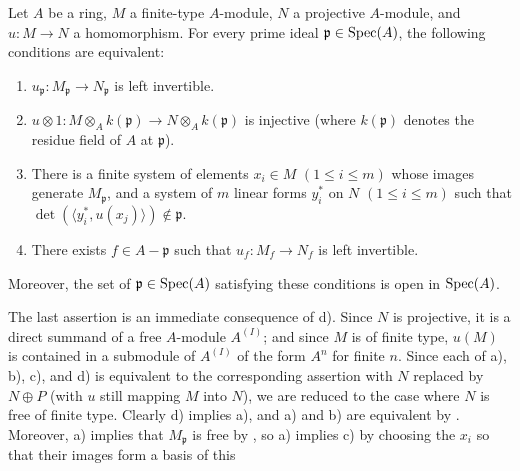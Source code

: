 \begin{corollary}[19.1.12]
\label{0.19.1.12}
Let $A$ be a ring, $M$ a finite-type $A$-module, $N$ a projective $A$-module, and $u:M\to N$ a homomorphism.
For every prime ideal $\mathfrak p\in\operatorname{Spec}(A)$, the following conditions are equivalent:
\begin{enumerate}
  \item[a)] $u_{\mathfrak p}:M_{\mathfrak p}\to N_{\mathfrak p}$ is left invertible.
  \item[b)] $u\otimes1:M\otimes_Ak(\mathfrak p)\to N\otimes_Ak(\mathfrak p)$ is injective (where $k(\mathfrak p)$ denotes the residue field of $A$ at $\mathfrak p$).
  \item[c)] There is a finite system of elements $x_i\in M$ $(1\leq i\leq m)$ whose images generate $M_{\mathfrak p}$, and a system of $m$ linear forms $y_i^*$ on $N$ $(1\leq i\leq m)$ such that $\det(\langle y_i^*,u(x_j)\rangle)\notin\mathfrak p$.
  \item[d)] There exists $f\in A-\mathfrak p$ such that $u_f:M_f\to N_f$ is left invertible.
\end{enumerate}
Moreover, the set of $\mathfrak p\in\operatorname{Spec}(A)$ satisfying these conditions is open in $\operatorname{Spec}(A)$.
\end{corollary}

The last assertion is an immediate consequence of d).
Since $N$ is projective, it is a direct summand of a free $A$-module $A^{(I)}$;
and since $M$ is of finite type, $u(M)$ is contained in a submodule of $A^{(I)}$ of the form $A^n$ for finite $n$.
Since each of a), b), c), and d) is equivalent to the corresponding assertion with $N$ replaced by $N\oplus P$ (with $u$ still mapping $M$ into $N$), we are reduced to the case where $N$ is free of finite type.
Clearly d) implies a), and a) and b) are equivalent by .
Moreover, a) implies that $M_{\mathfrak p}$ is free by , so a) implies c) by choosing the $x_i$ so that their images form a basis of this


